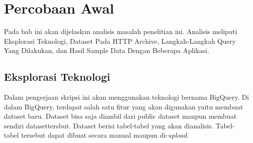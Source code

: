 \chapter{Percobaan Awal}
\label{chap:percobaan_awal}
Pada bab ini akan dijelaskan analisis masalah penelitian ini. Analisis meliputi Eksplorasi Teknologi, Dataset Pada HTTP Archive, Langkah-Langkah Query Yang Dilakukan, dan Hasil Sample Data Dengan Beberapa Aplikasi.

\section{Eksplorasi Teknologi}
Dalam pengerjaan skripsi ini akan menggunakan teknologi bernama BigQuery. Di dalam BigQuery, terdapat salah satu fitur yang akan digunakan yaitu membuat dataset baru. Dataset bisa saja diambil dari public dataset maupun membuat sendiri datasettersbut. Dataset berisi tabel-tabel yang akan dianalisis. Tabel-tabel tersebut dapat dibuat secara manual maupun di-\textit{upload}.

